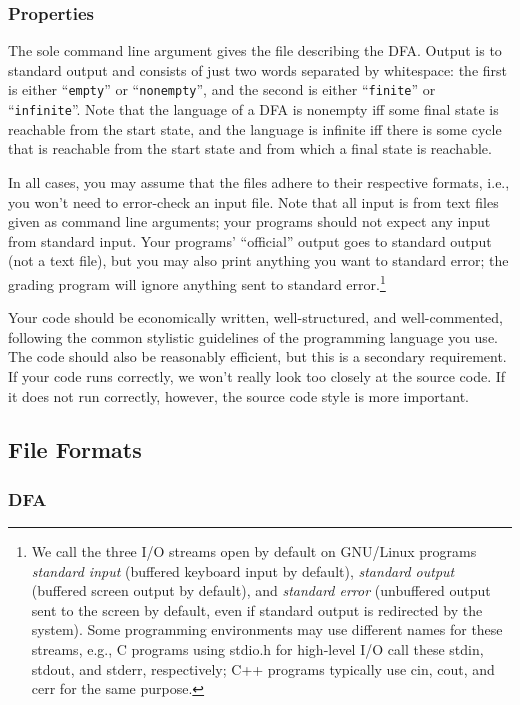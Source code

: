 \documentclass[11pt]{article}
\begin{document}
\subsubsection{Properties}
The sole command line argument gives the file describing the
DFA\@.  Output is to standard output and consists of just two
words separated by whitespace: the first is either
``\texttt{empty}'' or ``\texttt{nonempty}'', and the second is
either ``\texttt{finite}'' or ``\texttt{infinite}''.  Note that
the language of a DFA is nonempty iff some final state is
reachable from the start state, and the language is infinite iff
there is some cycle that is reachable from the start state and
from which a final state is reachable.

In all cases, you may assume that the files adhere to their respective
formats, i.e., you won't need to error-check an input file.  Note that
all input is from text files given as command line arguments; your
programs should not expect any input from standard input.  Your
programs' ``official'' output goes to standard output (not a text
file), but you may also print anything you want to standard error; the
grading program will ignore anything sent to standard
error.\footnote{We call the three I/O streams open by default on
GNU/Linux programs \emph{standard input} (buffered keyboard input by
default), \emph{standard output} (buffered screen output by default),
and \emph{standard error} (unbuffered output sent to the screen by
default, even if standard output is redirected by the system).  Some
programming environments may use different names for these streams,
e.g., C programs using stdio.h for high-level I/O call these stdin,
stdout, and stderr, respectively; C++ programs typically use cin,
cout, and cerr for the same purpose.}

Your code should be economically written, well-structured, and
well-commented, following the common stylistic guidelines of the
programming language you use.  The code should also be reasonably
efficient, but this is a secondary requirement.  If your code runs
correctly, we won't really look too closely at the source code.  If it
does not run correctly, however, the source code style is more
important.

\subsection{File Formats}

\subsubsection{DFA}\label{sec:dfa-format}
\end{document}
